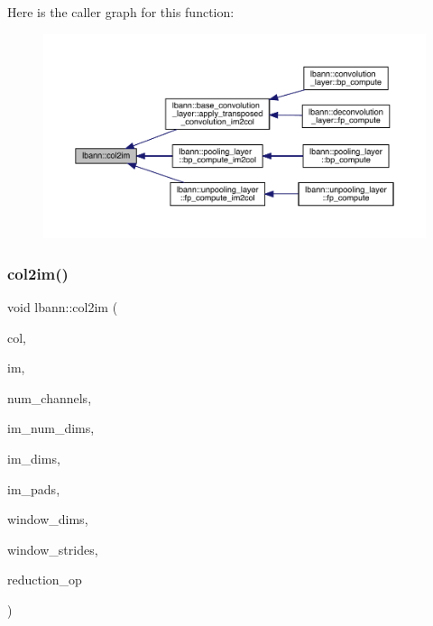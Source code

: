 Here is the caller graph for this function\+:\nopagebreak
\begin{figure}[H]
\begin{center}
\leavevmode
\includegraphics[width=350pt]{namespacelbann_a0e1225f72580ffb5166181392b68b651_icgraph}
\end{center}
\end{figure}
\mbox{\label{namespacelbann_ab36806d08e7c852ad9cf3a0564f29b64}} 
\subsubsection{\texorpdfstring{col2im()}{col2im()}\hspace{0.1cm}{\footnotesize\ttfamily [2/2]}}
{\footnotesize\ttfamily void lbann\+::col2im (\begin{DoxyParamCaption}\item[{const \hyperlink{base_8hpp_a68f11fdc31b62516cb310831bbe54d73}{Mat} \&}]{col,  }\item[{\hyperlink{base_8hpp_a68f11fdc31b62516cb310831bbe54d73}{Mat} \&}]{im,  }\item[{int}]{num\+\_\+channels,  }\item[{int}]{im\+\_\+num\+\_\+dims,  }\item[{const int $\ast$}]{im\+\_\+dims,  }\item[{const int $\ast$}]{im\+\_\+pads,  }\item[{const int $\ast$}]{window\+\_\+dims,  }\item[{const int $\ast$}]{window\+\_\+strides,  }\item[{std\+::function$<$ Data\+Type(const Data\+Type \&, const Data\+Type \&)$>$}]{reduction\+\_\+op }\end{DoxyParamCaption})}



